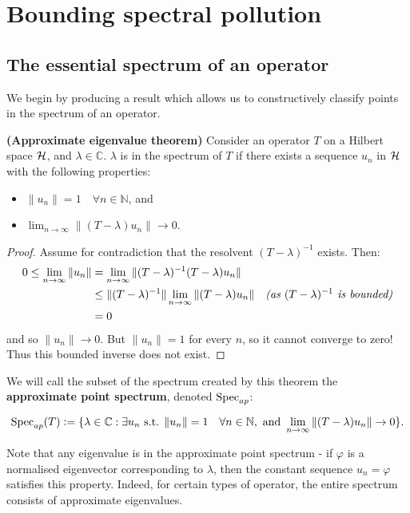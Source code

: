 \documentclass[../main.tex]{subfiles}
\begin{document}
\section{Bounding spectral pollution}\label{chapter:bounds}

\subsection{The essential spectrum of an operator}\label{sec:ess-spec}

We begin by producing a result which allows us to constructively classify points in the spectrum of an operator.
\begin{theorem}{\textbf{(Approximate eigenvalue theorem)}}\label{thm:approx-eigenvalue-thm}
Consider an operator $T$ on a Hilbert space $\mathcal{H}$, and $\lambda \in \mathbb{C}$. $\lambda$ is in the spectrum of $T$ if there exists a sequence $u_n$ in $\mathcal{H}$ with the following properties:
\begin{itemize}
\item $\|u_n\| = 1\quad \forall n \in \mathbb{N}$, and
\item $\lim_{n \rightarrow \infty}\|(T - \lambda)u_n\|  \rightarrow 0$.
\end{itemize}
\end{theorem}
\begin{proof}
Assume for contradiction that the resolvent $(T - \lambda)^{-1}$ exists. Then:
\begin{align*}
0 \leq \lim_{n \rightarrow \infty} \|u_n\| & = \lim_{n \rightarrow \infty} \|(T - \lambda)^{-1}(T - \lambda)u_n\| & \\
& \leq \|(T - \lambda)^{-1}\| \lim_{n \rightarrow \infty} \|(T - \lambda)u_n\| & \text{\emph{(as $(T - \lambda)^{-1}$ is bounded)}}\\
& = 0
\end{align*}
and so $\|u_n\| \rightarrow 0$. But $\|u_n\| = 1$ for every $n$, so it cannot converge to zero! Thus this bounded inverse does not exist.
\end{proof}
We will call the subset of the spectrum created by this theorem the \textbf{approximate point spectrum}, denoted $\mathrm{Spec}_{ap}$:

$$\mathrm{Spec}_{ap}(T) \mathrel{\mathop:}= \{ \lambda \in \mathbb{C} : \exists u_n \text{ s.t. } \|u_n\| = 1\quad \forall n \in \mathbb{N},\text{ and }\lim_{n \rightarrow \infty}\|(T - \lambda)u_n\|  \rightarrow 0\}.$$

Note that any eigenvalue is in the approximate point spectrum - if $\varphi$ is a normalised eigenvector corresponding to $\lambda$, then the constant
sequence $u_n = \varphi$ satisfies this property. Indeed, for certain types of operator, the entire spectrum consists of approximate eigenvalues.
\end{document}

